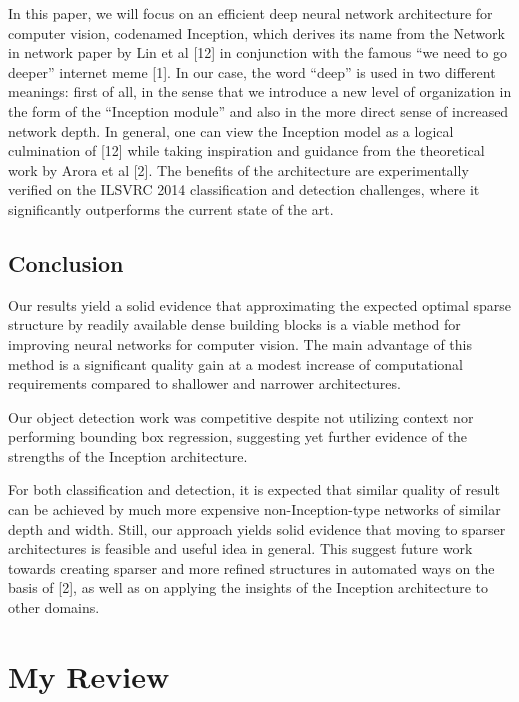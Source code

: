 \documentclass{article}
\begin{document}
In this paper, we will focus on an efficient deep neural
network architecture for computer vision, codenamed Inception,
which derives its name from the Network in network
paper by Lin et al [12] in conjunction with the famous
“we need to go deeper” internet meme [1]. In our case, the
word “deep” is used in two different meanings: first of all,
in the sense that we introduce a new level of organization
in the form of the “Inception module” and also in the more
direct sense of increased network depth. In general, one can
view the Inception model as a logical culmination of [12]
while taking inspiration and guidance from the theoretical
work by Arora et al [2]. The benefits of the architecture are
experimentally verified on the ILSVRC 2014 classification
and detection challenges, where it significantly outperforms
the current state of the art.

\subsection{Conclusion}

Our results yield a solid evidence that approximating the
expected optimal sparse structure by readily available dense
building blocks is a viable method for improving neural networks
for computer vision. The main advantage of this
method is a significant quality gain at a modest increase
of computational requirements compared to shallower and
narrower architectures.

Our object detection work was competitive despite not
utilizing context nor performing bounding box regression,
suggesting yet further evidence of the strengths of the Inception
architecture.

For both classification and detection, it is expected that
similar quality of result can be achieved by much more expensive
non-Inception-type networks of similar depth and
width. Still, our approach yields solid evidence that moving
to sparser architectures is feasible and useful idea in
general. This suggest future work towards creating sparser
and more refined structures in automated ways on the basis
of [2], as well as on applying the insights of the Inception
architecture to other domains.


\section{My Review}
\end{document}
